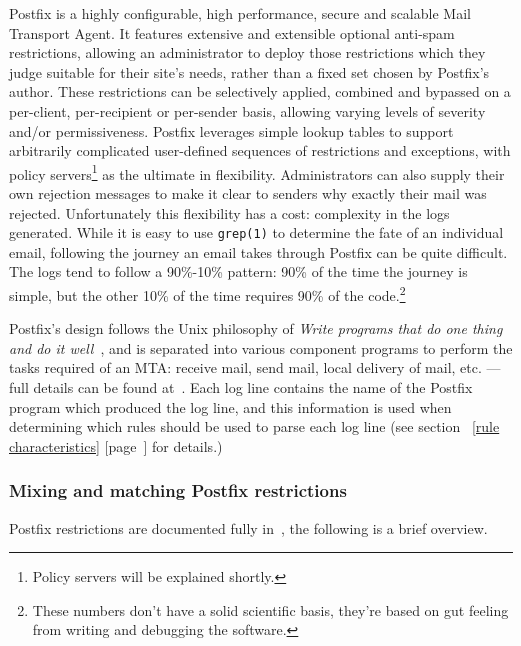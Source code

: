 \documentclass[a4paper,12pt,draft]{article}
\newcommand{\refwithpage}[1]{%
    \empty{}\ref{#1} [page~\pageref{#1}]%
}
\begin{document}
Postfix is a highly configurable, high performance, secure and scalable
Mail Transport Agent.  It features extensive and extensible optional
anti-spam restrictions, allowing an administrator to deploy those
restrictions which they judge suitable for their site's needs, rather than
a fixed set chosen by Postfix's author.  These restrictions can be
selectively applied, combined and bypassed on a per-client, per-recipient
or per-sender basis, allowing varying levels of severity and/or
permissiveness.  Postfix leverages simple lookup tables to support
arbitrarily complicated user-defined sequences of restrictions and
exceptions, with policy servers\footnote{Policy servers will be explained
shortly.} as the ultimate in flexibility.  Administrators can also supply
their own rejection messages to make it clear to senders why exactly their
mail was rejected.  Unfortunately this flexibility has a cost: complexity
in the logs generated.  While it is easy to use \texttt{grep(1)} to
determine the fate of an individual email, following the journey an email
takes through Postfix can be quite difficult.  The logs tend to follow a
90\%-10\% pattern: 90\% of the time the journey is simple, but the other
10\% of the time requires 90\% of the code.\footnote{These numbers don't
have a solid scientific basis, they're based on gut feeling from writing
and debugging the software.}

Postfix's design follows the Unix philosophy of \textit{Write programs that
do one thing and do it well\/}~\cite{unix-philosophy}, and is separated
into various component programs to perform the tasks required of an MTA\@:
receive mail, send mail, local delivery of mail, etc. --- full details can
be found at~\cite{postfix-overview}.  Each log line contains the name of
the Postfix program which produced the log line, and this information is
used when determining which rules should be used to parse each log line
(see section~\refwithpage{rule characteristics} for details.)

\subsubsection{Mixing and matching Postfix restrictions}

Postfix restrictions are documented fully in~\cite{smtpd_access_readme,
smtpd_per_user_control, policy-servers}, the following is a brief overview.
\end{document}
